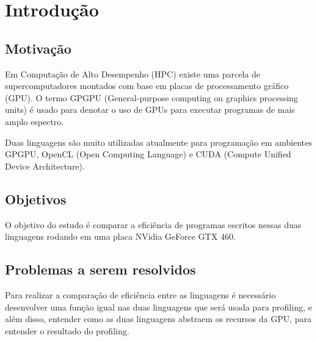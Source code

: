 \section{Introdução}
\subsection{Motivação}
Em Computação de Alto Desempenho (HPC) existe uma parcela de supercomputadores montados com base em placas
de processamento gráfico (GPU). O termo GPGPU (General-purpose computing on graphics processing units) é
usado para denotar o uso de GPUs para executar programas de mais amplo espectro.

Duas linguagens são muito utilizadas atualmente para programação em ambientes GPGPU, OpenCL (Open Computing Language) 
e CUDA (Compute Unified Device Architecture).

\subsection{Objetivos}
O objetivo do estudo é comparar a eficiência de programas escritos nessas duas linguagens rodando em uma placa NVidia GeForce GTX 460.

\subsection{Problemas a serem resolvidos}
Para realizar a comparação de eficiência entre as linguagens é necessário desenvolver uma função igual nas duas linguagens que será usada
para profiling, e além disso, entender como as duas linguagens abstraem os recursos da GPU, para entender o resultado do profiling.
